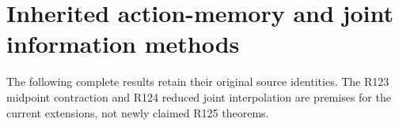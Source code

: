 \documentclass[ecta,nameyear,draft]{econsocart}
\begin{document}















\section{Inherited action-memory and joint information methods}
The following complete results retain their original source identities.
The R123 midpoint contraction and R124 reduced joint interpolation are
premises for the current extensions, not newly claimed R125 theorems.








\begingroup
\let\NBOBibliographyStart\thebibliography
\renewcommand{\thebibliography}[1]{\NBOBibliographyStart{#1}\raggedright}

\endgroup
\end{document}
